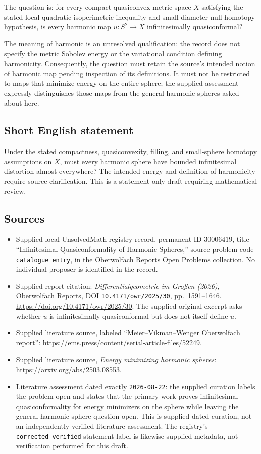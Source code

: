 \documentclass[11pt]{article}
\begin{document}
The question is: for every compact quasiconvex metric space \(X\) satisfying the stated local quadratic isoperimetric inequality and small-diameter null-homotopy hypothesis, is every harmonic map \(u:S^2\to X\) infinitesimally quasiconformal?

The meaning of harmonic is an unresolved qualification: the record does not specify the metric Sobolev energy or the variational condition defining harmonicity. Consequently, the question must retain the source's intended notion of harmonic map pending inspection of its definitions. It must not be restricted to maps that minimize energy on the entire sphere; the supplied assessment expressly distinguishes those maps from the general harmonic spheres asked about here.
\subsection{Short English statement}
Under the stated compactness, quasiconvexity, filling, and small-sphere homotopy assumptions on \(X\), must every harmonic sphere have bounded infinitesimal distortion almost everywhere? The intended energy and definition of harmonicity require source clarification. This is a statement-only draft requiring mathematical review.
\subsection{Sources}
\begin{itemize}
\item Supplied local UnsolvedMath registry record, permanent ID \(30006419\), title ``Infinitesimal Quasiconformality of Harmonic Spheres,'' source problem code \texttt{catalogue entry}, in the Oberwolfach Reports Open Problems collection. No individual proposer is identified in the record.
\item Supplied report citation: \emph{Differentialgeometrie im Großen (2026)}, Oberwolfach Reports, DOI \texttt{10.4171/owr/2025/30}, pp.\ 1591--1646. \url{https://doi.org/10.4171/owr/2025/30}. The supplied original excerpt asks whether \(u\) is infinitesimally quasiconformal but does not itself define \(u\).
\item Supplied literature source, labeled ``Meier--Vikman--Wenger Oberwolfach report'': \url{https://ems.press/content/serial-article-files/52249}.
\item Supplied literature source, \emph{Energy minimizing harmonic spheres}: \url{https://arxiv.org/abs/2503.08553}.
\item Literature assessment dated exactly \texttt{2026-08-22}: the supplied curation labels the problem open and states that the primary work proves infinitesimal quasiconformality for energy minimizers on the sphere while leaving the general harmonic-sphere question open. This is supplied dated curation, not an independently verified literature assessment. The registry's \texttt{corrected\_verified} statement label is likewise supplied metadata, not verification performed for this draft.
\end{itemize}
\end{document}
